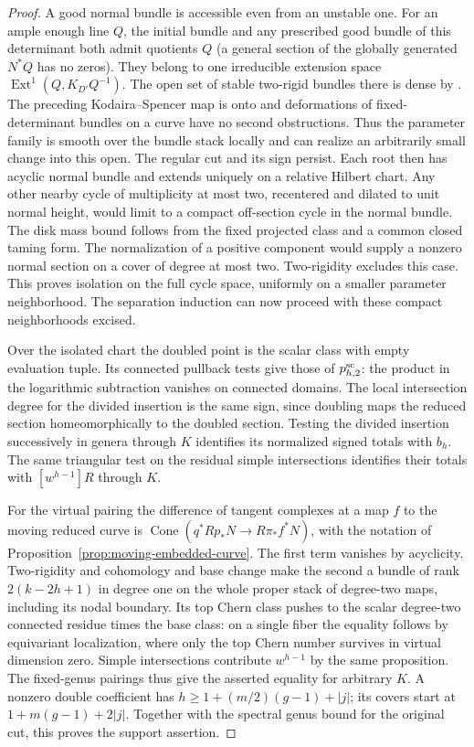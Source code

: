 \begin{proof}
A good normal bundle is accessible even from an unstable one.
For an ample enough line $Q$, the initial bundle and any prescribed
good bundle of this determinant both admit quotients $Q$ (a general
section of the globally generated $N^*Q$ has no zeros). They belong
to one irreducible extension space
$\operatorname{Ext}^1(Q,K_{D'}Q^{-1})$. The open set of stable
two-rigid bundles there is dense by \cite[Theorem~2.2]{BP06}.
The preceding Kodaira--Spencer map is onto and deformations of
fixed-determinant bundles on a curve have no second obstructions.
Thus the parameter family is smooth over the bundle stack locally
and can realize an arbitrarily small change into this open.
The regular cut and its sign persist. Each root then has acyclic
normal bundle and extends uniquely on a relative Hilbert chart.
Any other nearby cycle of multiplicity at most two, recentered
and dilated to unit normal height, would limit to a compact
off-section cycle in the normal bundle. The disk mass bound follows
from the fixed projected class and a common closed taming form.
The normalization of a positive component would supply a nonzero
normal section on a cover of degree at most two. Two-rigidity excludes
this case. This proves isolation on the full cycle space, uniformly
on a smaller parameter neighborhood. The separation induction can
now proceed with these compact neighborhoods excised.

Over the isolated chart the doubled point is the scalar class with
empty evaluation tuple. Its connected pullback tests give those of
$p_{h,2}^{\rm sc}$: the product in the logarithmic subtraction
vanishes on connected domains. The local intersection degree for the
divided insertion is the same sign, since doubling maps the reduced
section homeomorphically to the doubled section. Testing the divided
insertion successively in genera through $K$ identifies its normalized
signed totals with $b_h$. The same triangular test on the residual
simple intersections identifies their totals with $[w^{h-1}]R$
through $K$.

For the virtual pairing the difference of tangent complexes at a
map $f$ to the moving reduced curve is
$\operatorname{Cone}(q^*Rp_*N\to R\pi_*f^*N)$, with the notation of
Proposition~\ref{prop:moving-embedded-curve}. The first term vanishes
by acyclicity. Two-rigidity and cohomology and base change make the
second a bundle of rank $2(k-2h+1)$ in degree one on the whole
proper stack of degree-two maps, including its nodal boundary.
Its top Chern class pushes to the scalar degree-two connected residue
times the base class: on a single fiber the equality follows by
equivariant localization, where only the top Chern number survives
in virtual dimension zero. Simple intersections contribute
$w^{h-1}$ by the same proposition. The fixed-genus pairings thus
give the asserted equality for arbitrary $K$. A nonzero double
coefficient has $h\ge1+(m/2)(g-1)+|j|$; its covers start at
$1+m(g-1)+2|j|$. Together with the spectral genus bound for the
original cut, this proves the support assertion.
\end{proof}

